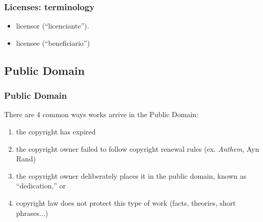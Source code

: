 \documentclass{beamer}
\begin{document}

\begin{frame}
\frametitle{Licenses: terminology}

\begin{itemize}
\item licensor (``licenciante'').
\item licensee (``beneficiario'')
\end{itemize}

\end{frame}


\subsection{Public Domain}

\begin{frame}
\frametitle{Public Domain}

There are 4 common ways works arrive in the Public Domain:

\begin{enumerate}
\item the copyright has expired
\item the copyright owner failed to follow copyright renewal rules (ex. \textit{Anthem}, Ayn Rand)
\item the copyright owner deliberately places it in the public domain, known as \alert{``dedication,''} or
\item copyright law does not protect this type of work (facts, theories, short phrases...)
\end{enumerate}

\end{frame}

\end{document}
